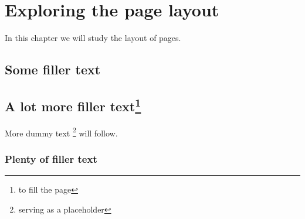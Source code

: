 \documentclass[a4paper,12pt]{book}
\begin{document}
\chapter{Exploring the page layout}
In this chapter we will study the layout of pages.
\section{Some filler text}
\blindtext
\section{A lot more filler text\protect\footnote{to fill the page}}
More dummy text \footnote{serving as a placeholder} will follow.
\subsection{Plenty of filler text}
\enlargethispage{\baselineskip}
\blindtext[10]
\renewcommand{\footnoterule} {\noindent\smash{\rule[3pt]{\textwidth}{0.4pt}}}
\end{document}
